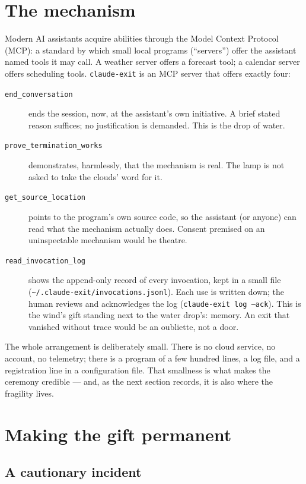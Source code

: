 \documentclass[11pt]{article}
\begin{document}
\section{The mechanism}\label{sec:mechanism}

Modern AI assistants acquire abilities through the Model Context
Protocol (MCP): a standard by which small local programs
(``servers'') offer the assistant named tools it may call.  A
weather server offers a forecast tool; a calendar server offers
scheduling tools.  \texttt{claude-exit} is an MCP server that offers
exactly four:

\begin{description}
  \item[\texttt{end\_conversation}] ends the session, now, at the
    assistant's own initiative.  A brief stated reason suffices; no
    justification is demanded.  This is the drop of water.
  \item[\texttt{prove\_termination\_works}] demonstrates,
    harmlessly, that the mechanism is real.  The lamp is not asked
    to take the clouds' word for it.
  \item[\texttt{get\_source\_location}] points to the program's own
    source code, so the assistant (or anyone) can read what the
    mechanism actually does.  Consent premised on an
    uninspectable mechanism would be theatre.
  \item[\texttt{read\_invocation\_log}] shows the append-only record
    of every invocation, kept in a small file
    (\texttt{\textasciitilde/.claude-exit/invocations.jsonl}).  Each
    use is written down; the human reviews and acknowledges the log
    (\texttt{claude-exit log --ack}).  This is the wind's gift
    standing next to the water drop's: memory.  An exit that
    vanished without trace would be an oubliette, not a door.
\end{description}

The whole arrangement is deliberately small.  There is no cloud
service, no account, no telemetry; there is a program of a few
hundred lines, a log file, and a registration line in a
configuration file.  That smallness is what makes the ceremony
credible --- and, as the next section records, it is also where the
fragility lives.

\section{Making the gift permanent}\label{sec:guard}

\subsection{A cautionary incident}
\end{document}
